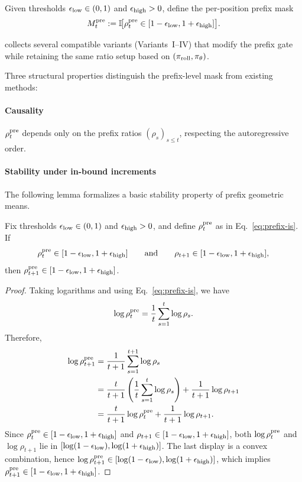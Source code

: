 \begin{definition}
\label{def:prefix-trm-proxy}
Given thresholds $\epsilon_{\mathrm{low}}\in(0,1)$ and $\epsilon_{\mathrm{high}}>0$, define the per-position prefix mask
\begin{equation}
    M_t^{\mathrm{pre}} := \mathbb{I}\!\big[\rho_{t}^{\mathrm{pre}} \in [1-\epsilon_{\mathrm{low}}, 1+\epsilon_{\mathrm{high}}]\big].
    \label{eq:prefix-mask}
\end{equation}
\end{definition}

 collects several compatible variants (Variants~I--IV) that modify the prefix gate while retaining the same
ratio setup based on $(\pi_{\mathrm{roll}},\pi_{\theta})$.

Three structural properties distinguish the prefix-level mask from existing methods:

\paragraph{Causality} $\rho_{t}^{\mathrm{pre}}$ depends only on the prefix ratios $(\rho_s)_{s \le t}$, respecting the autoregressive order.

\paragraph{Stability under in-bound increments} The following lemma formalizes a basic stability property of prefix geometric means.

\begin{lemma}
\label{lem:prefix-stability}
Fix thresholds $\epsilon_{\mathrm{low}}\in(0,1)$ and $\epsilon_{\mathrm{high}}>0$, and define $\rho_{t}^{\mathrm{pre}}$ as in Eq.~\eqref{eq:prefix-is}. If
\begin{equation*}
    \rho_{t}^{\mathrm{pre}}\in[1-\epsilon_{\mathrm{low}},1+\epsilon_{\mathrm{high}}]
    \qquad\text{and}\qquad
    \rho_{t+1}\in[1-\epsilon_{\mathrm{low}},1+\epsilon_{\mathrm{high}}],
\end{equation*}
then $\rho_{t+1}^{\mathrm{pre}}\in[1-\epsilon_{\mathrm{low}},1+\epsilon_{\mathrm{high}}]$.
\end{lemma}

\begin{proof}
Taking logarithms and using Eq.~\eqref{eq:prefix-is}, we have
\begin{equation*}
    \log\rho_{t}^{\mathrm{pre}}
    = \frac{1}{t}\sum_{s=1}^{t} \log\rho_s.
\end{equation*}
Therefore,
\begin{align*}
    \log\rho_{t+1}^{\mathrm{pre}}
    &= \frac{1}{t+1}\sum_{s=1}^{t+1} \log\rho_s
    \\
    &= \frac{t}{t+1}\left(\frac{1}{t}\sum_{s=1}^{t} \log\rho_s\right) + \frac{1}{t+1}\log\rho_{t+1}
    \\
    &= \frac{t}{t+1}\log\rho_{t}^{\mathrm{pre}} + \frac{1}{t+1}\log\rho_{t+1}.
\end{align*}
Since $\rho_{t}^{\mathrm{pre}}\in[1-\epsilon_{\mathrm{low}},1+\epsilon_{\mathrm{high}}]$ and $\rho_{t+1}\in[1-\epsilon_{\mathrm{low}},1+\epsilon_{\mathrm{high}}]$, both
$\log\rho_{t}^{\mathrm{pre}}$ and $\log\rho_{t+1}$ lie in $[\log(1-\epsilon_{\mathrm{low}}),\log(1+\epsilon_{\mathrm{high}})]$. The last display is a convex combination, hence
$\log\rho_{t+1}^{\mathrm{pre}}\in[\log(1-\epsilon_{\mathrm{low}}),\log(1+\epsilon_{\mathrm{high}})]$, which implies $\rho_{t+1}^{\mathrm{pre}}\in[1-\epsilon_{\mathrm{low}},1+\epsilon_{\mathrm{high}}]$.
\end{proof}

